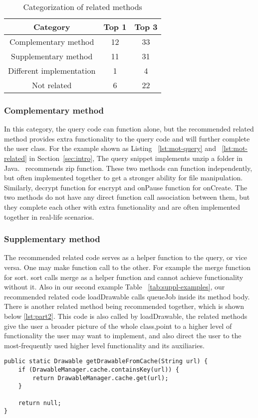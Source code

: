 \begin{table}
	\begin{center}
		\begin{tabular}{ c|c|c } 
			Category & Top 1 & Top 3 \\\hline
			Complementary method &  12 & 33\\\hline 
			Supplementary method &  11 & 31 \\ \hline
			Different implementation &  1 & 4 \\ \hline
			Not related & 6 & 22
		\end{tabular}		
	\end{center}
	\caption{Categorization of related methods}
	\label{tab:categorization}
\end{table}
	
	

\subsubsection{Complementary method} In this category, the query code can function alone, but the recommended related method provides extra functionality to the query code and will further complete the user class. For the example shown as Listing ~\ref{lst:mot-query} and ~\ref{lst:mot-related} in Section~\ref{sec:intro}, The query snippet implements unzip a folder in Java.  \tool\ recommends {\ttt zip} function. These two methods can function independently, but often implemented together to get a stronger ability for file manipulation. Similarly, {\ttt decrypt} function for {\ttt encrypt} and {\ttt onPause} function for {\ttt onCreate}. The two methods do not have any direct function call association between them, but they complete each other with extra functionality and are often implemented together in real-life scenarios. 

\subsubsection{Supplementary method} The recommended related code serves as a helper function to the query, or vice versa. One may make function call to the other. For example the {\ttt merge} function for {\ttt sort}. {\ttt sort} calls {\ttt merge} as a helper function and cannot achieve functionality without it. Also in our second example Table ~\ref{tab:suppl-examples}, our recommended related code {\ttt loadDrawable} calls {\ttt queueJob} inside its method body. There is another related method being recommended together, which is shown below \ref{lst:part2}. This code is also called by {\ttt loadDrawable}, the related methods give the user a broader picture of the whole class,point to a higher level of functionality the user may want to implement, and also direct the user to the most-frequently used higher level functionality and its auxiliaries.
\begin{lstlisting}[caption={Recommended code \#2}, label={lst:part2}]
public static Drawable getDrawableFromCache(String url) {
	if (DrawableManager.cache.containsKey(url)) {
		return DrawableManager.cache.get(url);
	}
	
	return null;
}	
\end{lstlisting}

